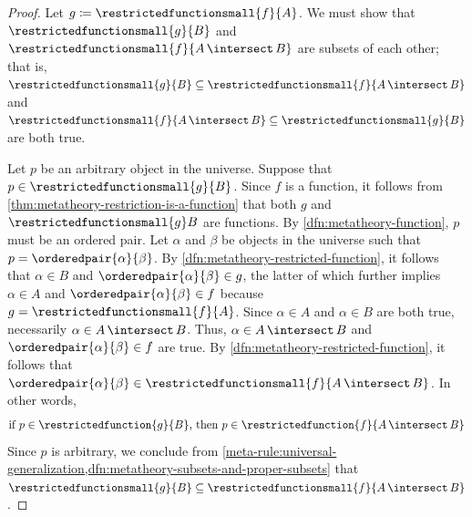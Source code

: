 \begin{proof}
    Let \( g \coloneq \restrictedfunctionsmall{f}{A} \).
    We must show that \( \restrictedfunctionsmall{g}{B} \) and \( \restrictedfunctionsmall{f}{A \,{\intersect}\, B} \) are subsets of each other; that is,
    \( \restrictedfunctionsmall{g}{B} \subseteq \restrictedfunctionsmall{f}{A \,{\intersect}\, B} \)
    and \( \restrictedfunctionsmall{f}{A \,{\intersect}\, B} \subseteq \restrictedfunctionsmall{g}{B} \) are both true.

    \vspace{0.3cm}
    \noindent
    Let \( p \) be an arbitrary object in the universe. Suppose that \( p \in \restrictedfunctionsmall{g}{B} \).
    Since \( f \) is a function, it follows from \cref{thm:metatheory-restriction-is-a-function} that both
    \( g \) and \( \restrictedfunctionsmall{g}B \) are functions.
    By \cref{dfn:metatheory-function}, \( p \) must be an ordered pair.
    Let \( \alpha \) and \( \beta \) be objects in the universe such that \( p = \orderedpair{\alpha}{\beta} \).
    By \cref{dfn:metatheory-restricted-function}, it follows that \( \alpha \in B \) and \( \orderedpair{\alpha}{\beta} \in g \),
    the latter of which further implies \( \alpha \in A \) and \( \orderedpair{\alpha}{\beta} \in f \) because \( g = \restrictedfunctionsmall{f}{A} \).
    Since \( \alpha \in A \) and \( \alpha \in B \) are both true, necessarily \( \alpha \in A \,{\intersect}\, B \).
    Thus, \( \alpha \in A \,{\intersect}\, B \) and \( \orderedpair{\alpha}{\beta} \in f \) are true.
    By \cref{dfn:metatheory-restricted-function}, it follows that \( \orderedpair{\alpha}{\beta} \in \restrictedfunctionsmall{f}{A \,{\intersect}\, B} \).
    In other words,
    \begin{equation*}
        \text{if \( p \in \restrictedfunction{g}{B} \), then \( p \in \restrictedfunction{f}{A \,{\intersect}\, B} \)}
    \end{equation*}
    Since \( p \) is arbitrary, we conclude from \cref{meta-rule:universal-generalization,dfn:metatheory-subsets-and-proper-subsets} that
    \( \restrictedfunctionsmall{g}{B} \subseteq \restrictedfunctionsmall{f}{A \,{\intersect}\, B} \).


\end{proof}

